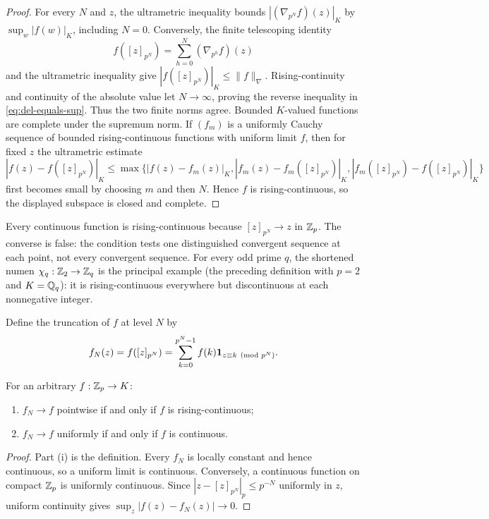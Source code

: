 \begin{proof}
For every $N$ and $z$, the ultrametric inequality bounds
$|(\nabla_{p^N}f)(z)|_K$ by $\sup_w|f(w)|_K$, including $N=0$.  Conversely,
the finite telescoping identity
\[
 f([z]_{p^N})=\sum_{h=0}^N(\nabla_{p^h}f)(z)
\]
and the ultrametric inequality give
$|f([z]_{p^N})|_K\leq\|f\|_\nabla$.  Rising-continuity and continuity of
the absolute value let $N\to\infty$, proving the reverse inequality in
\cref{eq:del-equals-sup}.  Thus the two finite norms agree.  Bounded
$K$-valued functions are complete under the supremum norm.  If $(f_m)$ is a
uniformly Cauchy sequence of bounded rising-continuous functions with uniform
limit $f$, then for fixed $z$ the ultrametric estimate
\[
 |f(z)-f([z]_{p^N})|_K
 \leq\max\{|f(z)-f_m(z)|_K,
            |f_m(z)-f_m([z]_{p^N})|_K,
            |f_m([z]_{p^N})-f([z]_{p^N})|_K\}
\]
first becomes small by choosing $m$ and then $N$.  Hence $f$ is
rising-continuous, so the displayed subspace is closed and complete.
\end{proof}

Every continuous function is rising-continuous because
$[z]_{p^N}\to z$ in $\mathbb Z_p$.  The converse is false: the condition tests one
distinguished convergent sequence at each point, not every convergent
sequence.  For every odd prime $q$, the shortened numen
$\chi_q:\mathbb Z_2\to\mathbb Z_q$ is the principal example (the preceding definition with
$p=2$ and $K=\mathbb Q_q$): it is rising-continuous everywhere but discontinuous at
each nonnegative integer.

Define the truncation of $f$ at level $N$ by
\begin{equation}
\label{eq:function-truncation}
 f_N(z)=f([z]_{p^N})
 =\sum_{k=0}^{p^N-1}f(k)\mathbf 1_{z\equiv k\pmod{p^N}}.
\end{equation}

\begin{proposition}
\label{prop:rising-vs-continuous}
For an arbitrary $f:\mathbb Z_p\to K$:
\begin{enumerate}[label=\textup{(\roman*)}]
\item $f_N\to f$ pointwise if and only if $f$ is rising-continuous;
\item $f_N\to f$ uniformly if and only if $f$ is continuous.
\end{enumerate}
\end{proposition}

\begin{proof}
Part (i) is the definition.  Every $f_N$ is locally constant and hence
continuous, so a uniform limit is continuous.  Conversely, a continuous
function on compact $\mathbb Z_p$ is uniformly continuous.  Since
$|z-[z]_{p^N}|_p\leq p^{-N}$ uniformly in $z$, uniform continuity gives
$\sup_z|f(z)-f_N(z)|\to0$.
\end{proof}


